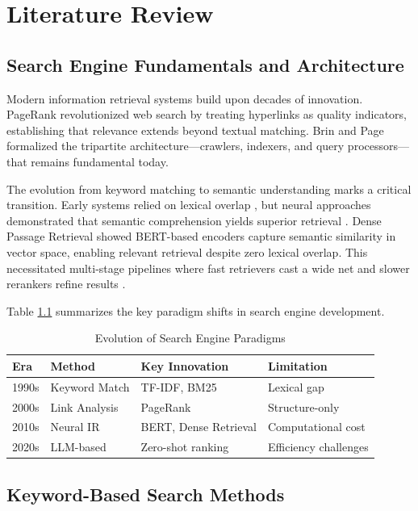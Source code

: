 \chapter{Literature Review}

\section{Search Engine Fundamentals and Architecture}

Modern information retrieval systems build upon decades of innovation. PageRank \cite{page1999pagerank} revolutionized web search by treating hyperlinks as quality indicators, establishing that relevance extends beyond textual matching. Brin and Page \cite{brin1998anatomy} formalized the tripartite architecture—crawlers, indexers, and query processors—that remains fundamental today.

The evolution from keyword matching to semantic understanding marks a critical transition. Early systems relied on lexical overlap \cite{baeza1999modern}, but neural approaches demonstrated that semantic comprehension yields superior retrieval \cite{mitra2017neural}. Dense Passage Retrieval \cite{karpukhin2020dense} showed BERT-based encoders capture semantic similarity in vector space, enabling relevant retrieval despite zero lexical overlap. This necessitated multi-stage pipelines where fast retrievers cast a wide net and slower rerankers refine results \cite{nogueira2019passage}.

Table \ref{tab:search_evolution} summarizes the key paradigm shifts in search engine development.

\begin{table}[h]
\centering
\caption{Evolution of Search Engine Paradigms}
\label{tab:search_evolution}
\begin{tabular}{llll}
\toprule
\textbf{Era} & \textbf{Method} & \textbf{Key Innovation} & \textbf{Limitation} \\
\midrule
1990s & Keyword Match & TF-IDF, BM25 & Lexical gap \\
2000s & Link Analysis & PageRank & Structure-only \\
2010s & Neural IR & BERT, Dense Retrieval & Computational cost \\
2020s & LLM-based & Zero-shot ranking & Efficiency challenges \\
\bottomrule
\end{tabular}
\end{table}

\section{Keyword-Based Search Methods}

